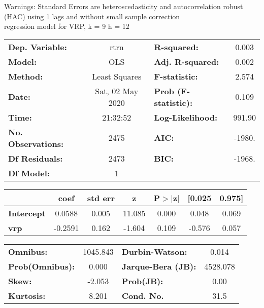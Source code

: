 Warnings: \newline
 [1] Standard Errors are heteroscedasticity and autocorrelation robust (HAC) using 1 lags and without small sample correction\\ 

regression model for VRP, k = 9 h = 12\begin{center}
\begin{tabular}{lclc}
\toprule
\textbf{Dep. Variable:}    &       rtrn       & \textbf{  R-squared:         } &     0.003   \\
\textbf{Model:}            &       OLS        & \textbf{  Adj. R-squared:    } &     0.002   \\
\textbf{Method:}           &  Least Squares   & \textbf{  F-statistic:       } &     2.574   \\
\textbf{Date:}             & Sat, 02 May 2020 & \textbf{  Prob (F-statistic):} &    0.109    \\
\textbf{Time:}             &     21:32:52     & \textbf{  Log-Likelihood:    } &    991.90   \\
\textbf{No. Observations:} &        2475      & \textbf{  AIC:               } &    -1980.   \\
\textbf{Df Residuals:}     &        2473      & \textbf{  BIC:               } &    -1968.   \\
\textbf{Df Model:}         &           1      & \textbf{                     } &             \\
\bottomrule
\end{tabular}
\begin{tabular}{lcccccc}
                   & \textbf{coef} & \textbf{std err} & \textbf{z} & \textbf{P$> |$z$|$} & \textbf{[0.025} & \textbf{0.975]}  \\
\midrule
\textbf{Intercept} &       0.0588  &        0.005     &    11.085  &         0.000        &        0.048    &        0.069     \\
\textbf{vrp}       &      -0.2591  &        0.162     &    -1.604  &         0.109        &       -0.576    &        0.057     \\
\bottomrule
\end{tabular}
\begin{tabular}{lclc}
\textbf{Omnibus:}       & 1045.843 & \textbf{  Durbin-Watson:     } &    0.014  \\
\textbf{Prob(Omnibus):} &   0.000  & \textbf{  Jarque-Bera (JB):  } & 4528.078  \\
\textbf{Skew:}          &  -2.053  & \textbf{  Prob(JB):          } &     0.00  \\
\textbf{Kurtosis:}      &   8.201  & \textbf{  Cond. No.          } &     31.5  \\
\bottomrule
\end{tabular}
\end{center}

